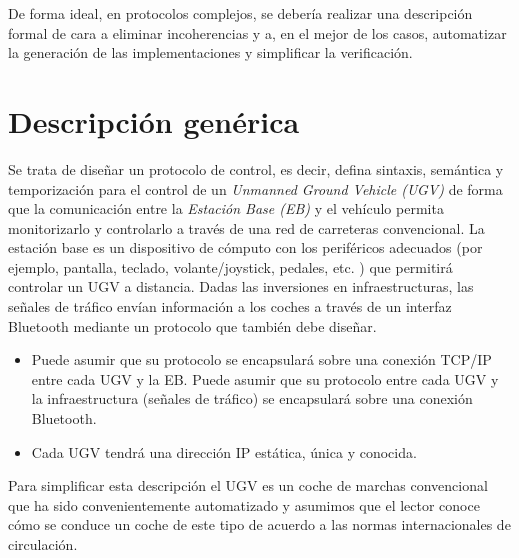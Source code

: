De forma ideal, en protocolos complejos, se debería realizar una descripción formal de cara a eliminar incoherencias y a, en el mejor de los casos, automatizar la generación de las implementaciones y simplificar la verificación.


\section{Descripción genérica}
Se trata de diseñar un protocolo de control, es decir, defina
sintaxis, semántica y temporización para el control de un \emph{Unmanned
Ground Vehicle (UGV)} de forma que la comunicación entre la \emph{Estación
Base (EB)} y el vehículo permita monitorizarlo y controlarlo a través
de una red de carreteras convencional. La estación base es un
dispositivo de cómputo con los periféricos adecuados (por ejemplo,
pantalla, teclado, volante/joystick, pedales, etc. ) que permitirá
controlar un UGV a distancia. Dadas las inversiones en infraestructuras, las señales de tráfico envían información a los coches a través de un interfaz Bluetooth mediante un protocolo que también debe diseñar.
\begin{itemize}
\item Puede asumir que su protocolo se
encapsulará sobre una conexión TCP/IP entre cada UGV y la EB. Puede asumir que
su protocolo entre cada UGV y la infraestructura (señales de tráfico) se encapsulará sobre una conexión Bluetooth. 
\item Cada UGV tendrá una dirección IP estática, única y conocida.
\end{itemize}
Para simplificar esta descripción el UGV es un coche de marchas convencional que ha sido convenientemente automatizado y asumimos que el lector conoce cómo se conduce un coche de este tipo de acuerdo a las normas internacionales de circulación.

